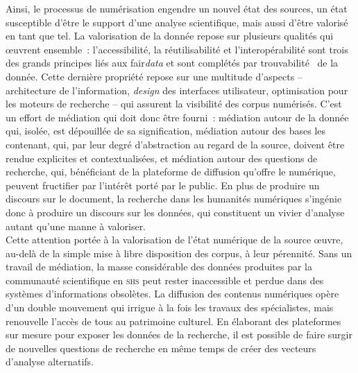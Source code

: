 \documentclass[a4paper,12pt,twoside]{book}
\newcommand{\eng}{\emph}
\newcommand{\shs}{\textsc{shs}\xspace}
\newcommand{\g}[1]{\og#1~\fg}
\newcommand{\fair}{\gls{fair}\xspace}
\begin{document}
Ainsi, le processus de numérisation engendre un nouvel état des sources, un état susceptible d'être le support d'une analyse scientifique, mais aussi d'être valorisé en tant que tel. La valorisation de la donnée repose sur plusieurs qualités qui œuvrent ensemble~: l'accessibilité, la réutilisabilité et l'interopérabilité sont trois des grands principes liés aux \fair \eng{data} et sont complétés par \g{trouvabilité} de la donnée. Cette dernière propriété repose sur une multitude d'aspects – architecture de l'information, \eng{design} des interfaces utilisateur, optimisation pour les moteurs de recherche – qui assurent la visibilité des corpus numérisés. C'est un effort de médiation qui doit donc être fourni~: médiation autour de la donnée qui, isolée, est dépouillée de sa signification, médiation autour des bases les contenant, qui, par leur degré d'abstraction au regard de la source, doivent être rendue explicites et contextualisées, et médiation autour des questions de recherche, qui, bénéficiant de la plateforme de diffusion qu'offre le numérique, peuvent fructifier par l'intérêt porté par le public. En plus de produire un discours sur le document, la recherche dans les humanités numériques s'ingénie donc à produire un discours sur les données, qui constituent un vivier d'analyse autant qu'une manne à valoriser.\\

Cette attention portée à la valorisation de l'état numérique de la source œuvre, au-delà de la simple mise à libre disposition des corpus, à leur pérennité. Sans un travail de médiation, la masse considérable des données produites par la communauté scientifique en \shs peut rester inaccessible et perdue dans des systèmes d'informations obsolètes. La diffusion des contenus numériques opère d'un double mouvement qui irrigue à la fois les travaux des spécialistes, mais renouvelle l'accès de tous au patrimoine culturel. En élaborant des plateformes sur mesure pour exposer les données de la recherche, il est possible de faire surgir de nouvelles questions de recherche en même temps de créer des vecteurs d'analyse alternatifs.\\
\end{document}
